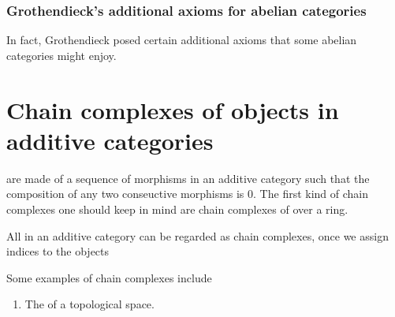 \subsubsection{Grothendieck's additional axioms for abelian categories}

In fact, Grothendieck posed certain additional axioms that some abelian categories might enjoy.











\section{Chain complexes of objects in additive categories}

 are made of a sequence of morphisms in an additive category such that the composition of any two conseuctive morphisms is $0$. The first kind of chain complexes one should keep in mind are chain complexes of  over a ring.






\begin{example}
    All  in an additive category can be regarded as chain complexes, once we assign indices to the objects
\end{example}


\begin{example}
    Some examples of chain complexes include  \TODO{}
    \begin{enumerate}
        \item The  of a topological space.
    \end{enumerate}
\end{example}

